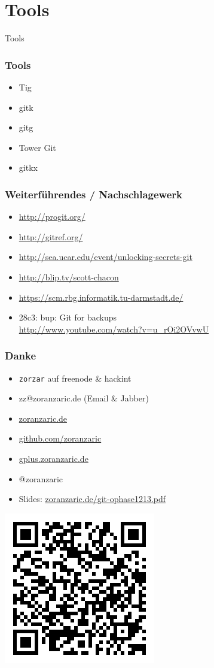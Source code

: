 \documentclass[]{beamer}
\begin{document}
\section{Tools}
\begin{frame}
	\fontsize{30}{10}\selectfont Tools
\end{frame}

\begin{frame}
	\frametitle{Tools}
	\begin{itemize}
		\item
			Tig
		\item
			gitk
		\item
			gitg
		\item
			Tower Git
		\item
			gitkx
	\end{itemize}
\end{frame}

\begin{frame}
	\frametitle{Weiterführendes / Nachschlagewerk}
	\begin{itemize}
		\item
			\url{http://progit.org/}
		\item
			\url{http://gitref.org/}
		\item
			\url{http://sea.ucar.edu/event/unlocking-secrets-git}
		\item
			\url{http://blip.tv/scott-chacon}
		\item
			\url{https://scm.rbg.informatik.tu-darmstadt.de/}
		\item
			28c3: bup: Git for backups\\
			\url{http://www.youtube.com/watch?v=u_rOi2OVvwU}
	\end{itemize}
\end{frame}

\begin{frame}[fragile]
	\frametitle{Danke}
	\begin{itemize}
		\item
			\verb|zorzar| auf freenode \& hackint
		\item
			zz@zoranzaric.de (Email \& Jabber)
		\item
			\url{zoranzaric.de}
		\item
			\url{github.com/zoranzaric}
		\item
			\url{gplus.zoranzaric.de}
		\item
			@zoranzaric\\[0.5cm]
		\item
			Slides: \url{zoranzaric.de/git-ophase1213.pdf}
	\end{itemize}
\end{frame}

\begin{frame}
	\includegraphics{qr-code.png}
\end{frame}
\end{document}
